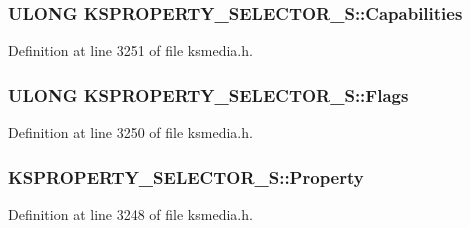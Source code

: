 \subsubsection[{\texorpdfstring{Capabilities}{Capabilities}}]{\setlength{\rightskip}{0pt plus 5cm}U\+L\+O\+NG K\+S\+P\+R\+O\+P\+E\+R\+T\+Y\+\_\+\+S\+E\+L\+E\+C\+T\+O\+R\+\_\+\+S\+::\+Capabilities}\hypertarget{struct_k_s_p_r_o_p_e_r_t_y___s_e_l_e_c_t_o_r___s_af73dac4385bdc27851266e377a5f75b7}{}\label{struct_k_s_p_r_o_p_e_r_t_y___s_e_l_e_c_t_o_r___s_af73dac4385bdc27851266e377a5f75b7}


Definition at line 3251 of file ksmedia.\+h.

\subsubsection[{\texorpdfstring{Flags}{Flags}}]{\setlength{\rightskip}{0pt plus 5cm}U\+L\+O\+NG K\+S\+P\+R\+O\+P\+E\+R\+T\+Y\+\_\+\+S\+E\+L\+E\+C\+T\+O\+R\+\_\+\+S\+::\+Flags}\hypertarget{struct_k_s_p_r_o_p_e_r_t_y___s_e_l_e_c_t_o_r___s_a859996cbd230c31cc30b4736fa1ad9c4}{}\label{struct_k_s_p_r_o_p_e_r_t_y___s_e_l_e_c_t_o_r___s_a859996cbd230c31cc30b4736fa1ad9c4}


Definition at line 3250 of file ksmedia.\+h.

\subsubsection[{\texorpdfstring{Property}{Property}}]{ K\+S\+P\+R\+O\+P\+E\+R\+T\+Y\+\_\+\+S\+E\+L\+E\+C\+T\+O\+R\+\_\+\+S\+::\+Property}\hypertarget{struct_k_s_p_r_o_p_e_r_t_y___s_e_l_e_c_t_o_r___s_abe40cd95923a9f32ebb52c69b022b2f7}{}\label{struct_k_s_p_r_o_p_e_r_t_y___s_e_l_e_c_t_o_r___s_abe40cd95923a9f32ebb52c69b022b2f7}


Definition at line 3248 of file ksmedia.\+h.

